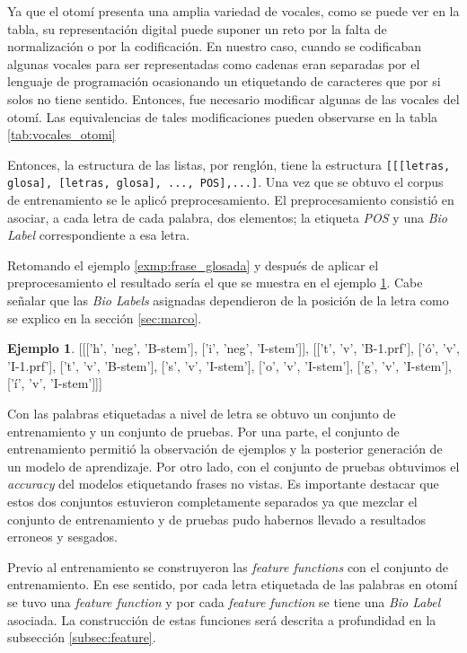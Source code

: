 \documentclass[letterpaper,12pt,oneside]{book}
\def\code#1{\texttt{#1}}
\theoremstyle{definition}
\newtheorem{exmp}{Ejemplo}[section]
\begin{document}
Ya que el otomí presenta una amplia variedad de vocales, como se puede ver en la tabla, su representación digital puede suponer un reto por la falta de normalización o por la codificación. En nuestro caso, cuando se codificaban algunas vocales para ser representadas como cadenas eran separadas por el lenguaje de programación ocasionando un etiquetando de caracteres que por si solos no tiene sentido. Entonces, fue necesario modificar algunas de las vocales del otomí. Las equivalencias de tales modificaciones pueden observarse en la tabla \ref{tab:vocales_otomi}

Entonces, la estructura de las listas, por renglón, tiene la estructura \code{[[[letras, glosa], [letras, glosa], ..., POS],...]}. Una vez que se obtuvo el corpus de entrenamiento se le aplicó preprocesamiento. El preprocesamiento consistió en asociar, a cada letra de cada palabra, dos elementos; la etiqueta \textit{POS} y una \textit{Bio Label} correspondiente a esa letra.

Retomando el ejemplo \ref{exmp:frase_glosada} y después de aplicar el preprocesamiento el resultado sería el que se muestra en el ejemplo \ref{exmp:frase_preproc}. Cabe señalar que las \textit{Bio Labels} asignadas dependieron de la posición de la letra como se explico en la sección \ref{sec:marco}.

\begin{exmp} \label{exmp:frase_preproc}
    \textsf{[[['h', 'neg', 'B-stem'], ['i', 'neg', 'I-stem']], [['t', 'v', 'B-1.prf'],
          ['ó', 'v', 'I-1.prf'],
          ['t', 'v', 'B-stem'],
          ['s', 'v', 'I-stem'],
          ['o', 'v', 'I-stem'],
          ['g', 'v', 'I-stem'],
          ['í', 'v', 'I-stem']]]}
\end{exmp}

Con las palabras etiquetadas a nivel de letra se obtuvo un conjunto de entrenamiento y un conjunto de pruebas. Por una parte, el conjunto de entrenamiento permitió la observación de ejemplos y la posterior generación de un modelo de aprendizaje. Por otro lado, con el conjunto de pruebas obtuvimos el \textit{accuracy} del modelos etiquetando frases no vistas. Es importante destacar que estos dos conjuntos estuvieron completamente separados ya que mezclar el conjunto de entrenamiento y de pruebas pudo habernos llevado a resultados erroneos y sesgados.

Previo al entrenamiento se construyeron las \textit{feature functions} con el conjunto de entrenamiento. En ese sentido, por cada letra etiquetada de las palabras en otomí se tuvo una \textit{feature function} y por cada \textit{feature function} se tiene una \textit{Bio Label} asociada. La construcción de estas funciones será descrita a profundidad en la subsección \ref{subsec:feature}.
\end{document}
